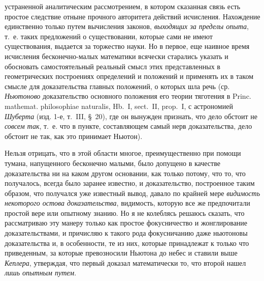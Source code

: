 устраненной аналитическим рассмотрением, в котором сказанная связь есть
простое следствие отныне прочного авторитета действий исчисления.
Нахождение единственно только путем вычисления законов,
{\em выходящих за пределы опыта}, т.~е. таких
предложений о существовании, которые сами не имеют существования, выдается
за торжество науки. Но в первое, еще наивное время исчисления
бесконечно-малых математики всячески старались указать и обосновать
самостоятельный реальный смысл этих представленных в геометрических
построениях определений и положений и применять их в таком смысле для
доказательства главных положений, о которых шла речь (ср.
{\em Ньютоново} доказательство основного положения его
теории тяготения в Princ. mathemat. philosophiae naturalis, Hb.~I,
sect.~II, prop.~I, с астрономией {\em Шуберта} (изд. 1-е, т.~III, §~20),
где он вынужден признать, что дело обстоит не
{\em совсем так}, т.~е. что в пункте, составляющем
самый нерв доказательства, дело обстоит не так, как это принимает Ньютон).

Нельзя отрицать, что в этой области многое, преимущественно при помощи
тумана, напущенного бесконечно малыми, было допущено в качестве
доказательства ни на каком другом основании, как только потому, что то, что
получалось, всегда было заранее известно, и доказательство, построенное
таким образом, что получался уже известный вывод, давало по крайней мере
{\em видимость некоторого остова доказательства},
видимость, которую все же предпочитали простой вере или опытному знанию. Но
я не колеблясь решаюсь сказать, что рассматриваю эту манеру только как
простое фокусничество и жонглирование доказательствами, и причисляю к
такого рода фокусничанию даже ньютоновы доказательства и, в особенности, те
из них, которые принадлежат к только что приведенным, за которые
превозносили Ньютона до небес и ставили выше
{\em Кеплера}, утверждая, что первый доказал
математически то, что второй нашел {\em лишь опытным путем}.

